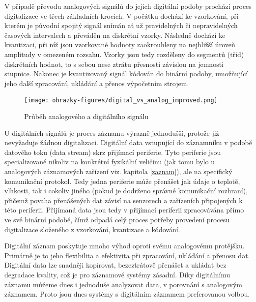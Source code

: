 V případě převodu analogových signálů do jejich digitální podoby prochází proces digitalizace ve třech základních krocích. V počátku dochází ke vzorkování, při kterém je původní spojitý signál snímán ať už pravidelných či nepravidelných časových intervalech a převáděn na diskrétní vzorky. Následně dochází ke kvantizaci, při níž jsou vzorkované hodnoty zaokrouhleny na nejbližší úroveň amplitudy v omezeném rozsahu. Vzorky jsou tedy rozděleny do segmentů (tříd) diskrétních hodnot, to s sebou nese ztrátu přesnosti závislou na jemnosti stupnice. Nakonec je kvantizovaný signál kódován do binární podoby, umožňující jeho další zpracování, ukládání a přenos výpočetním strojem.

\begin{figure}[h]
    \centering
    \texttt{[image: obrazky-figures/digital\_vs\_analog\_improved.png]}
    \caption{Průběh analogového a digitálního signálu}
    \label{fig:digital-vs-analog}
\end{figure}

U digitálních signálů je proces záznamu výrazně jednodušší, protože již nevyžaduje žádnou digitalizaci. Digitální data vstupující do záznamníku v podobě datového toku (data stream) skrz přijímací periferie. Tyto periferie jsou specializované nikoliv na konkrétní fyzikální veličinu (jak tomu bylo u analogových záznamových zařízení viz. kapitola \ref{zaznam}), ale na specifický komunikační protokol. Tedy jedna periferie může přenášet jak údaje o teplotě, vlhkosti, tak i cokoliv jiného (pokud je dodrženo správné komunikační rozhraní), přičemž povaha přenášených dat závisí na senzorech a zařízeních připojených k této periferii. Přijímaná data jsou tedy v přijímací periferii zpracovávána přímo ve své binární podobě, čímž odpadá celý proces potřeby provedení procesu digitalizace složeného z vzorkování, kvantizace a kódování. 

\newpage

Digitální záznam poskytuje mnoho výhod oproti svému analogovému protějšku. Primárně je to jeho flexibilita a efektivita při zpracování, ukládání a přenosu dat. Digitální data lze snadněji kopírovat, bezeztrátově přenášet a ukládat bez degradace kvality, což je pro záznamové systémy zásadní. Díky digitálnímu záznamu můžeme dnes i jednoduše analyzovat data, v porovnání s analogovým záznamem. Proto jsou dnes systémy s digitálním záznamem preferovanou volbou.

    
